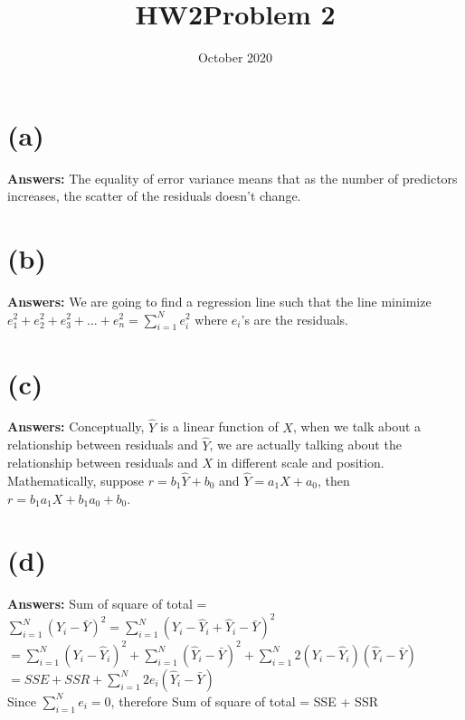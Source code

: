 \documentclass{article}
\title{HW2}
\date{October 2020}
\begin{document}
\maketitle
\title{Problem 2}
\section{(a)}\textbf{Answers:} The equality of error variance means that as the number of predictors increases, the scatter of the residuals doesn't change.\\
\section{(b)}\textbf{Answers:} We are going to find a regression line such that the line minimize $e_1^2 + e^2_2 + e^2_3 + ... + e^2_n = \sum^N_{i=1}e^2_i$ where $e_i$'s are the residuals.

\section{(c)}\textbf{Answers:} Conceptually, $\hat{Y}$ is a linear function of $X$, when we talk about a relationship between residuals and $\hat{Y}$, we are actually talking about the relationship between residuals and $X$ in different scale and position. Mathematically, suppose $r = b_1\hat{Y} + b_0$ and $\hat{Y} = a_1X+a_0$, then $r = b_1a_1X+b_1a_0+b_0$.

\section{(d)}\textbf{Answers:} Sum of square of total = $\sum^N_{i=1} (Y_i - \bar{Y})^2 = \sum^N_{i=1} (Y_i - \hat{Y}_i + \hat{Y}_i - \bar{Y})^2$\\
$= \sum^N_{i=1}(Y_i - \hat{Y}_i)^2 + \sum^N_{i=1}(\hat{Y}_i - \bar{Y})^2 + \sum^N_{i=1} 2(Y_i - \hat{Y}_i)(\hat{Y}_i - \bar{Y})$\\
$= SSE + SSR + \sum^N_{i=1}2e_i(\hat{Y}_i - \bar{Y})$\\
Since $\sum^N_{i=1} e_i = 0$, therefore Sum of square of total = SSE + SSR
\end{document}
